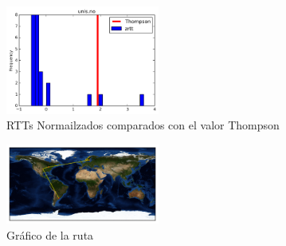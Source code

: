 \begin{center}

\end{center}

\begin{figure}[H]
  \centering
    \includegraphics[width=0.45\textwidth]{histogramas_thompson/unis-no.png}
  \caption{RTTs Normailzados comparados con el valor Thompson}
  \label{entropia-s}
\end{figure}

\begin{figure}[H]
  \centering
    \includegraphics[width=0.45\textwidth]{grafico-rutas/unis-no.png}
  \caption{Gráfico de la ruta}
  \label{entropia-s}
\end{figure}




